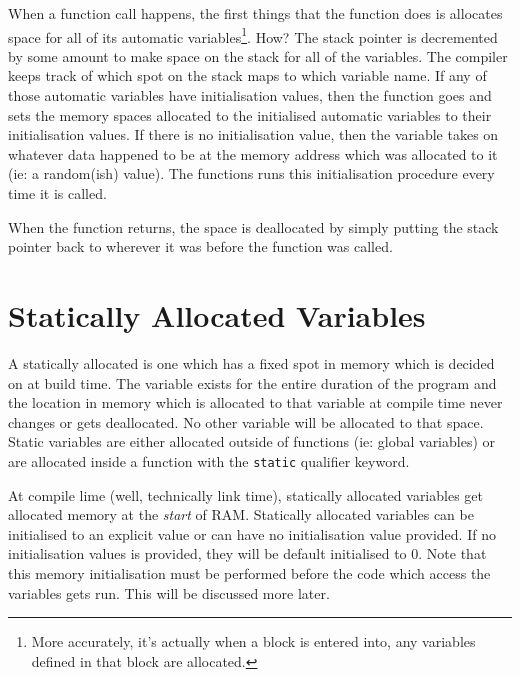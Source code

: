 When a function call happens, the first things that the function does is allocates space for all of its automatic variables\footnote{More accurately, it's actually when a block is entered into, any variables defined in that block are allocated.}. How? The stack pointer is decremented by some amount to make space on the stack for all of the variables. The compiler keeps track of which spot on the stack maps to which variable name. If any of those automatic variables have initialisation values, then the function goes and sets the memory spaces allocated to the initialised automatic variables to their initialisation values. If there is no initialisation value, then the variable takes on whatever data happened to be at the memory address which was allocated to it (ie: a random(ish) value). The functions runs this initialisation procedure every time it is called. 

When the function returns, the space is deallocated by simply putting the stack pointer back to wherever it was before the function was called. 

\section{Statically Allocated Variables}
A statically allocated is one which has a fixed spot in memory which is decided on at build time. The variable exists for the entire duration of the program and the location in memory which is allocated to that variable at compile time never changes or gets deallocated. No other variable will be allocated to that space.
Static variables are either allocated outside of functions (ie: global variables) or are allocated inside a function with the \texttt{static} qualifier keyword. 

At compile lime (well, technically link time), statically allocated variables get allocated memory at the \emph{start} of RAM. Statically allocated variables can be initialised to an explicit value or can have no initialisation value provided. If no initialisation values is provided, they will be default initialised to 0. Note that this memory initialisation must be performed before the code which access the variables gets run. This will be discussed more later.

